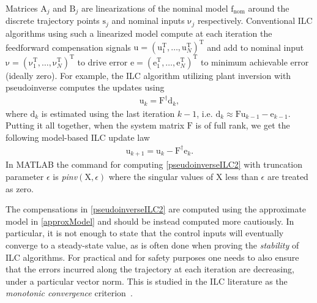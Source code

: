 \documentclass[10pt,a4paper]{article}
\theoremstyle{plain}
\theoremstyle{definition}
\newcommand{\boldvec}[1]{\boldsymbol{\mathrm{#1}}}
\let\vec\boldvec
\newcommand{\error}{\vec{e}} %
\newcommand{\traj}{\vec{s}} %
\newcommand{\linDist}{\vec{d}} %
\newcommand{\sysInput}{\vec{u}} %
\newcommand{\trjInput}{\vec{\nu}} %
\newcommand{\designMat}{\vec{X}} %
\newcommand{\systemMat}{\vec{F}} %
\newcommand{\dynamics}{\vec{f}}
\newcommand{\dynamicsNominal}{\dynamics_{\mathrm{nom}}}
\begin{document}
\noindent Matrices $\vec{A}_j$ and $\vec{B}_j$ are linearizations of the nominal model $\dynamicsNominal$ around the discrete trajectory points $\traj_j$ and nominal inputs $\vec{\nu}_j$ respectively. Conventional ILC algorithms using such a linearized model compute at each iteration the feedforward compensation signals $\sysInput = (\sysInput_1^{\mathrm{T}}, \ldots, \sysInput_N^{\mathrm{T}})^{\mathrm{T}}$ and add to nominal input $\trjInput = (\trjInput_1^{\mathrm{T}}, \ldots, \trjInput_N^{\mathrm{T}})^{\mathrm{T}}$ to drive error $\error = (\error_1^{\mathrm{T}}, \ldots, \error_N^{\mathrm{T}})^{\mathrm{T}}$ to minimum achievable error (ideally zero). For example, the ILC algorithm utilizing plant inversion with pseudoinverse computes the updates using %
% 
%
\begin{equation}
\begin{aligned}
\sysInput_{k} = \systemMat^{\dagger}\linDist_{k},
\end{aligned}
\label{pseudoinverseILC1}
\end{equation}
%
\noindent where $\linDist_{k}$ is estimated using the last iteration $k-1$, i.e. $\linDist_{k} \approx \systemMat \sysInput_{k-1} - \error_{k-1}$. Putting it all together, when the system matrix $\systemMat$ is of full rank, we get the following model-based ILC update law 
%
\begin{equation}
\begin{aligned}
\sysInput_{k+1} = \sysInput_{k} - \systemMat^{\dagger}\error_{k}.
\end{aligned}
\label{pseudoinverseILC2}
\end{equation}
%
\noindent In MATLAB the command for computing \eqref{pseudoinverseILC2} with truncation parameter $\epsilon$ is \emph{pinv}$(\designMat,\epsilon)$ where the singular values of $\designMat$ less than $\epsilon$ are treated as zero. 

The compensations in \eqref{pseudoinverseILC2} are computed using the approximate model in \eqref{approxModel} and should be instead computed more cautiously. In particular, it is not enough to state that the control inputs will eventually converge to a steady-state value, as is often done when proving the \emph{stability} of ILC algorithms. For practical and for safety purposes one needs to also ensure that the errors incurred along the trajectory at each iteration are decreasing, under a particular vector norm. This is studied in the ILC literature as the \emph{monotonic convergence} criterion~\cite{Bristow06}. 
\end{document}
